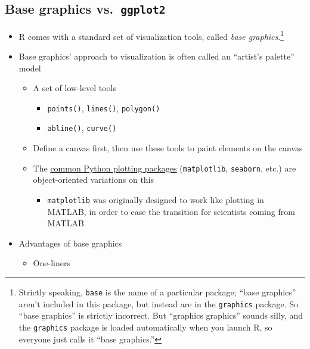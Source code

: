 \documentclass[
]{article}
\providecommand{\tightlist}{%
  \setlength{\itemsep}{0pt}\setlength{\parskip}{0pt}}
\begin{document}
\hypertarget{base-graphics-vs.-ggplot2}{%
\subsection{\texorpdfstring{Base graphics vs.~\texttt{ggplot2}}{Base graphics vs.~ggplot2}}\label{base-graphics-vs.-ggplot2}}

\begin{itemize}
\tightlist
\item
  R comes with a standard set of visualization tools, called \emph{base graphics}.\footnote{Strictly speaking, \texttt{base} is the name of a particular package; ``base graphics'' aren't included in this package, but instead are in the \texttt{graphics} package. So ``base graphics'' is strictly incorrect. But ``graphics graphics'' sounds silly, and the \texttt{graphics} package is loaded automatically when you launch R, so everyone just calls it ``base graphics.''}\\
\item
  Base graphics' approach to visualization is often called an ``artist's palette'' model

  \begin{itemize}
  \tightlist
  \item
    A set of low-level tools

    \begin{itemize}
    \tightlist
    \item
      \texttt{points()}, \texttt{lines()}, \texttt{polygon()}
    \item
      \texttt{abline()}, \texttt{curve()}
    \end{itemize}
  \item
    Define a canvas first, then use these tools to paint elements on the canvas
  \item
    The \href{https://pbpython.com/visualization-tools-1.html}{common Python plotting packages} (\texttt{matplotlib}, \texttt{seaborn}, etc.) are object-oriented variations on this

    \begin{itemize}
    \tightlist
    \item
      \texttt{matplotlib} was originally designed to work like plotting in MATLAB, in order to ease the transition for scientists coming from MATLAB
    \end{itemize}
  \end{itemize}
\item
  Advantages of base graphics

  \begin{itemize}
  \tightlist
  \item
    One-liners


\end{itemize}
\end{itemize}
\end{document}

